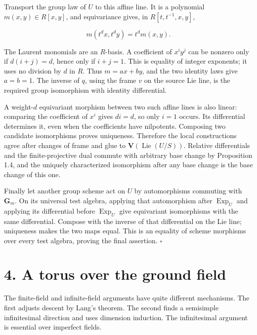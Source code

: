 \documentclass[11pt,a4paper,openany]{report}
\begin{document}
Transport the group law of \(U\) to this affine line. It is a polynomial \(m(x,y)\in R[x,y]\), and equivariance gives, in \(R[t,t^{-1},x,y]\),

\[
m(t^d x,t^d y)=t^d m(x,y).
\]

The Laurent monomials are an \(R\)-basis. A coefficient of \(x^i y^j\) can be nonzero only if \(d(i+j)=d\), hence only if \(i+j=1\). This is equality of integer exponents; it uses no division by \(d\) in \(R\). Thus \(m=ax+by\), and the two identity laws give \(a=b=1\). The inverse of \(q\), using the frame \(v\) on the source Lie line, is the required group isomorphism with identity differential.

A weight-\(d\) equivariant morphism between two such affine lines is also linear: comparing the coefficient of \(x^i\) gives \(di=d\), so only \(i=1\) occurs. Its differential determines it, even when the coefficients have nilpotents. Composing two candidate isomorphisms proves uniqueness. Therefore the local constructions agree after changes of frame and glue to \(\mathbf V(\operatorname{Lie}(U/S))\). Relative differentials and the finite-projective dual commute with arbitrary base change by Proposition 1.4, and the uniquely characterized isomorphism after any base change is the base change of this one.

Finally let another group scheme act on \(U\) by automorphisms commuting with \(\mathbf G_m\). On its universal test algebra, applying that automorphism after \(\operatorname{Exp}_U\) and applying its differential before \(\operatorname{Exp}_U\) give equivariant isomorphisms with the same differential. Compose with the inverse of that differential on the Lie line; uniqueness makes the two maps equal. This is an equality of scheme morphisms over every test algebra, proving the final assertion. \(\square\)

\section{4. A torus over the ground field}\label{AG-RG-01-a-torus-over-the-ground-field}

The finite-field and infinite-field arguments have quite different mechanisms. The first adjusts descent by Lang's theorem. The second finds a semisimple infinitesimal direction and uses dimension induction. The infinitesimal argument is essential over imperfect fields.

\label{AG-RG-01-lang-and-fixed-bases}
\end{document}
